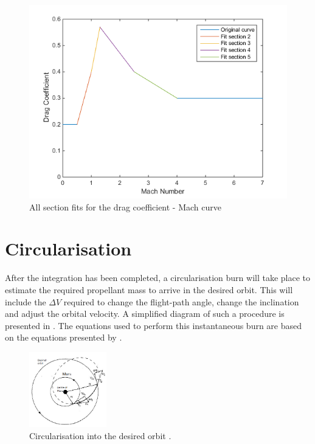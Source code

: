 \begin{figure}[!ht]
\centering
\includegraphics[width=1.0\textwidth]{figures/software/dragCoeffFit.png}
\caption{All section fits for the drag coefficient - Mach curve}
\label{fig:dragCoeffFit}
\end{figure}

\section{Circularisation}
\label{sec:modelCircularisation}
After the integration has been completed, a circularisation burn will take place to estimate the required propellant mass to arrive in the desired orbit. This will include the $\Delta V$ required to change the flight-path angle, change the inclination and adjust the orbital velocity. A simplified diagram of such a procedure is presented in . The equations used to perform this instantaneous burn are based on the equations presented by \cite{wakker2010}.



\begin{figure}[H]
\centering
\includegraphics[width=0.3\textwidth]{figures/circularisation/deltaVcircularOrbitMars_wakker2010.png}
\caption{Circularisation into the desired orbit \citep{deltaVcircularOrbitMars_wakker2010}.}
\label{fig:deltaVcircularOrbitMars_wakker2010}
\end{figure}

